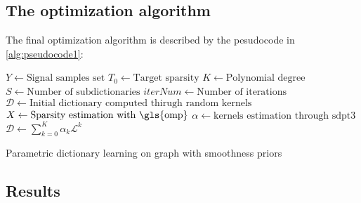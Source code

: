 \subsection{The optimization algorithm}
The final optimization algorithm is described by the pesudocode in \autoref{alg:pseudocode1}:
\begin{algorithm}[tb]
  \label{alg:pseudocode1}
  \begin{algorithmic}[1]
      \State $Y \gets \text{Signal samples set}$
      \State $T_0\gets \text{Target sparsity}$
      \State $K \gets \text{Polynomial degree}$
      \State $S \gets \text{Number of subdictionaries}$
      \State $iterNum \gets \text{Number of iterations}$
      \State $\mathcal{D} \gets \text{Initial dictionary computed thirugh random kernels}$
    \EndProcedure
        \State {}
        \State $X \gets \text{Sparsity estimation with \gls{omp}}$
      \EndProcedure
        $\alpha \gets \text{kernels estimation through sdpt3}$
      \EndProcedure
        \State $\mathcal{D} \gets \sum_{k=0}^K \alpha_k \mathcal{L}^k$
      \EndProcedure
    \EndFor
  \end{algorithmic}
  \caption{Parametric dictionary learning on graph with smoothness priors}
\end{algorithm}

\subsection{Results}
\label{sec:dataGen}
